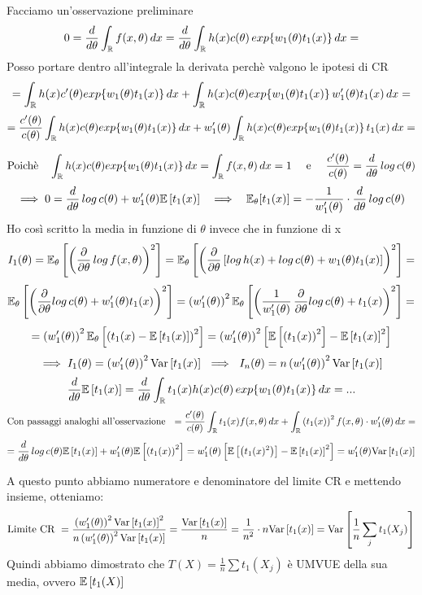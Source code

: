\phantom{}






\begin{Dim}[*]
    Facciamo un'osservazione preliminare
    \[
    0=\frac{d}{d\theta} \int_{\R} f(x,\theta)\,dx = \frac{d}{d\theta} \int_{\R} h(x)c(\theta)\, exp\{w_1(\theta) t_1(x) \} \, dx = \]
    Posso portare dentro all'integrale la derivata perchè valgono le ipotesi di CR
    \[
    = \int_{\R} h(x) c'(\theta) exp\{w_1(\theta) t_1(x) \} \, dx + \int_{\R} h(x)c(\theta)exp\{w_1(\theta) t_1(x) \} \, w_1'(\theta) t_1(x)  \, dx = \]
    \[=\frac{c'(\theta)}{c(\theta)} \int_{\R} h(x) c(\theta) exp\{w_1(\theta) t_1(x) \} \, dx + w_1'(\theta) \int_{\R} h(x)c(\theta) exp\{w_1(\theta) t_1(x) \}\, t_1(x) \, dx=
    \]

    \[
    \text{Poichè } \ \ \int_{\R} h(x) c(\theta) exp\{w_1(\theta) t_1(x) \} \, dx = \int_{\R} f(x, \theta)\, dx = 1 \ \ \ \text{ e } \ \ \ \frac{c'(\theta)}{c(\theta)} = \frac{d}{d\theta} \, log \, c(\theta)
    \]
    \[
    \implies 0 = \dfrac{d}{d\theta} \, log \, c(\theta) + w'_1(\theta) \mathbb{E} \left[ t_1(x) \right]
    \ \  \implies \ \ \mathbb E_{\theta}[t_1(x)] = -\dfrac{1}{w_1'(\theta)}\cdot \dfrac{d}{d\theta} \, log\, c(\theta)
    \]
    Ho così scritto la media in funzione di $\theta$ invece che in funzione di x\\

    \[
    I_1(\theta)= \mathbb E_{\theta}\left[ \left( \dfrac{\partial}{\partial\theta} \, log \, f(x,\theta) \right)^2 \right] = \mathbb E_{\theta} \left[ \left( \dfrac{\partial }{\partial \theta} \left[ log\,h(x) + log \,c(\theta) + w_1(\theta)t_1(x) \right]  \right)^2 \right] =\]
    \[ \mathbb E_{\theta}\left[ \left( \dfrac{\partial }{\partial \theta}log\,c(\theta) + w_1'(\theta) t_1(x) \right)^2 \right] = \left( w_1'(\theta)\right)^2 \mathbb E_{\theta}\left[ \left( \dfrac{1}{w'_1(\theta)}\,\dfrac{\partial }{\partial \theta}log\,c(\theta) + t_1(x) \right)^2 \right] = \]
    \[
    =  \left( w_1'(\theta)\right)^2 \mathbb E_{\theta}\left[ \left( t_1(x) - \mathbb{E} \left[ t_1(x) \right] \right)^2 \right] = \left( w_1'(\theta)\right)^2 \left[ \mathbb{E} \left[  \left( t_1(x) \right)^2  \right] - \mathbb{E} \left[ t_1(x) \right]^2  \right] 
    \]
    \[
    \implies I_1(\theta)= \left( w_1'(\theta)\right)^2 \text{Var} \left[ t_1(x) \right] \ \implies \ I_n(\theta) = n \left( w_1'(\theta)\right)^2 \text{Var} \left[ t_1(x) \right]
    \]
    \phantom{}
    \[
    \frac{d}{d\theta} \E{t_1(x)} = \frac{d}{d\theta} \int_{\R} t_1(x)h(x)c(\theta) \, exp\{w_1(\theta) t_1(x) \}\, dx = ...\]
    \[
    \text{Con passaggi analoghi all'osservazione } \ = \frac{c'(\theta)}{c(\theta)} \int_{\R} t_1(x) f(x,\theta) \, dx + \int_{\R} \O t_1(x)\C^2 f(x,\theta) \cdot w_1'(\theta)\, dx =
    \]
    \[
    =\dfrac{d}{d\theta}\, log\,c(\theta) \mathbb E \left[ t_1(x) \right] + w_1'(\theta) \mathbb{E} \left[ \left( t_1(x)\right)^2 \right] = w_1'(\theta) \left[ \mathbb{E} \left[ \left( t_1(x)^2\right) \right] - \mathbb{E} \left[ t_1(x) \right]^2 \right] = w_1'(\theta) \text{Var} \left[ t_1(x) \right]
    \]
    \phantom{}
    
    A questo punto abbiamo numeratore e denominatore del limite CR e mettendo insieme, otteniamo:
    \[
    \text{Limite CR } = \dfrac{\left( w'_1(\theta)\right)^2 \text{Var} \left[ t_1(x) \right]^2}{n\left( w_1'(\theta)\right)^2 \text{Var} \left[ t_1(x) \right]} = \dfrac{\text{Var} \left[ t_1(x) \right]}{n} = \dfrac{1}{n^2} \cdot n\text{Var} \left[ t_1(x) \right] = \text{Var} \left[ \dfrac{1}{n} \sum_j t_1(X_j)  \right]
    \]
    Quindi abbiamo dimostrato che $T(X)=\frac{1}{n} \sum t_1(X_j)$ è UMVUE della sua media, ovvero $\mathbb{E} \left[ t_1(X) \right]$\\
\end{Dim}


